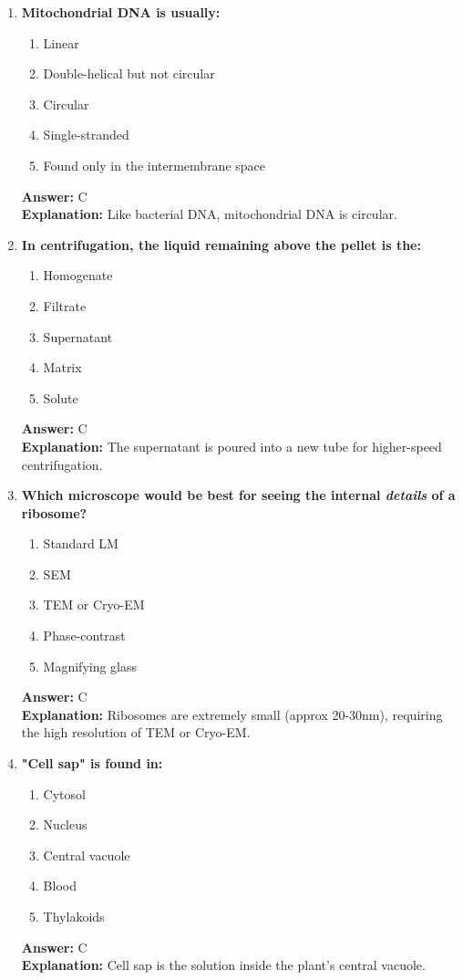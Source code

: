 \documentclass[11pt, a4paper]{article}
\begin{document}
\begin{enumerate}[leftmargin=*, label=\arabic*.]
\item \textbf{Mitochondrial DNA is usually:}
\begin{enumerate}[label=\Alph*.]
\item Linear
\item Double-helical but not circular
\item Circular
\item Single-stranded
\item Found only in the intermembrane space
\end{enumerate}
\textbf{Answer:} C \\
\textbf{Explanation:} Like bacterial DNA, mitochondrial DNA is circular.

\item \textbf{In centrifugation, the liquid remaining above the pellet is the:}
\begin{enumerate}[label=\Alph*.]
\item Homogenate
\item Filtrate
\item Supernatant
\item Matrix
\item Solute
\end{enumerate}
\textbf{Answer:} C \\
\textbf{Explanation:} The supernatant is poured into a new tube for higher-speed centrifugation.

\item \textbf{Which microscope would be best for seeing the internal \textit{details} of a ribosome?}
\begin{enumerate}[label=\Alph*.]
\item Standard LM
\item SEM
\item TEM or Cryo-EM
\item Phase-contrast
\item Magnifying glass
\end{enumerate}
\textbf{Answer:} C \\
\textbf{Explanation:} Ribosomes are extremely small (approx 20-30nm), requiring the high resolution of TEM or Cryo-EM.

\item \textbf{"Cell sap" is found in:}
\begin{enumerate}[label=\Alph*.]
\item Cytosol
\item Nucleus
\item Central vacuole
\item Blood
\item Thylakoids
\end{enumerate}
\textbf{Answer:} C \\
\textbf{Explanation:} Cell sap is the solution inside the plant's central vacuole.


\end{enumerate}
\end{document}

